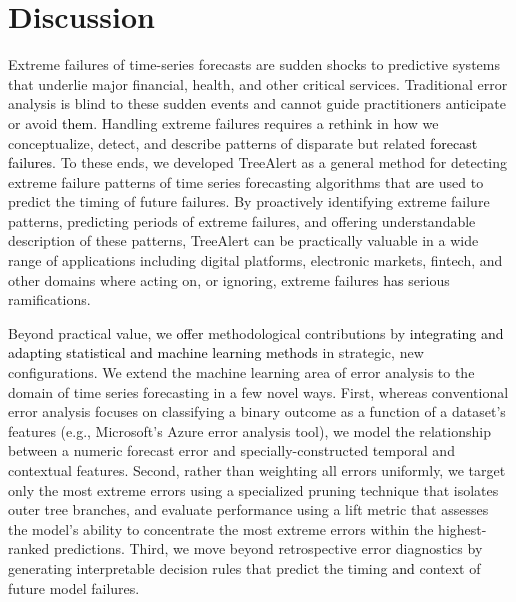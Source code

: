 \documentclass[12pt]{article}
\newcommand{\galit}[1]{\textcolor{black}{#1}}
\begin{document}
\FloatBarrier
\section{Discussion} 

Extreme failures of time-series forecasts are sudden shocks to predictive systems that underlie major financial, health, and other critical services. Traditional error analysis is blind to these sudden events and cannot guide practitioners anticipate or avoid \galit{them}. %
Handling extreme failures requires a rethink in how we conceptualize, detect, and describe patterns of disparate but related \galit{forecast failures}. %
To these ends, we developed TreeAlert as a general method for detecting extreme failure patterns of time series forecasting algorithms that \galit{are} %
used to predict the timing of future failures. By proactively identifying extreme failure patterns, predicting periods of extreme failures, and offering understandable description of these patterns, TreeAlert can be practically valuable in a wide range of applications including digital platforms, electronic markets, fintech, and other domains where acting on, or ignoring, extreme failures \galit{has} %
serious ramifications.

Beyond %
practical value, we \galit{offer} %
methodological contributions by %
\galit{integrating and adapting statistical and machine learning methods}
in strategic, new configurations. We extend the machine learning area of error analysis to the domain of time series forecasting in a few novel ways. First, whereas conventional error analysis focuses on classifying a binary outcome as a function of a %
dataset's features (e.g., Microsoft's Azure error analysis tool),
we model the relationship between a numeric forecast error and specially-constructed
temporal and contextual features. Second, rather than weighting all errors uniformly, we target only the most extreme %
errors using a specialized pruning technique that isolates outer tree branches, and evaluate performance using a lift metric that assesses the model's ability to concentrate the most extreme errors within the highest-ranked predictions. Third, we move beyond retrospective error diagnostics by generating interpretable decision rules that predict the timing \galit{and} context %
of future model failures.
\end{document}
